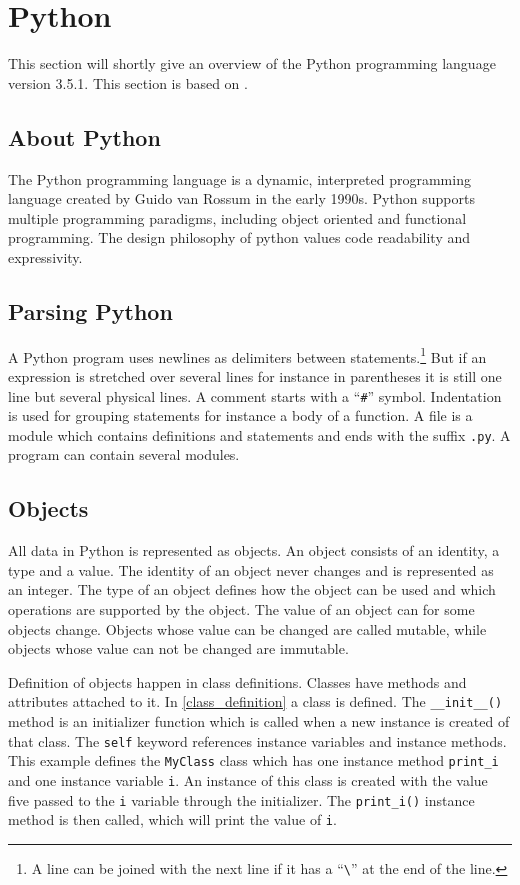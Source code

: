 \section{Python}\label{python}
This section will shortly give an overview of the Python programming language version 3.5.1.
This section is based on \citet{python_docs}.

\subsection{About Python}
The Python programming language is a dynamic, interpreted programming language created by Guido van Rossum in the early 1990s.
Python supports multiple programming paradigms, including object oriented and functional programming.
The design philosophy of python values code readability and expressivity.

\subsection{Parsing Python}
A Python program uses newlines as delimiters between statements.\footnote{A line can be joined with the next line if it has a ``\texttt{\textbackslash}'' at the end of the line.}
But if an expression is stretched over several lines for instance in parentheses it is still one line but several physical lines.
A comment starts with a ``\texttt{\#}'' symbol.
Indentation is used for grouping statements for instance a body of a function.
A file is a module which contains definitions and statements and ends with the suffix \texttt{.py}.
A program can contain several modules.

\subsection{Objects}
All data in Python is represented as objects.
An object consists of an identity, a type and a value.
The identity of an object never changes and is represented as an integer.
The type of an object defines how the object can be used and which operations are supported by the object.
The value of an object can for some objects change.
Objects whose value can be changed are called mutable, while objects whose value can not be changed are immutable.

Definition of objects happen in class definitions.
Classes have methods and attributes attached to it.
In \cref{class_definition} a class is defined.
The \texttt{\_\_init\_\_()} method is an initializer function which is called when a new instance is created of that class.
The \texttt{self} keyword references instance variables and instance methods.
This example defines the \texttt{MyClass} class which has one instance method \texttt{print\_i} and one instance variable \texttt{i}.
An instance of this class is created with the value five passed to the \texttt{i} variable through the initializer.
The \texttt{print\_i()} instance method is then called, which will print the value of \texttt{i}.

